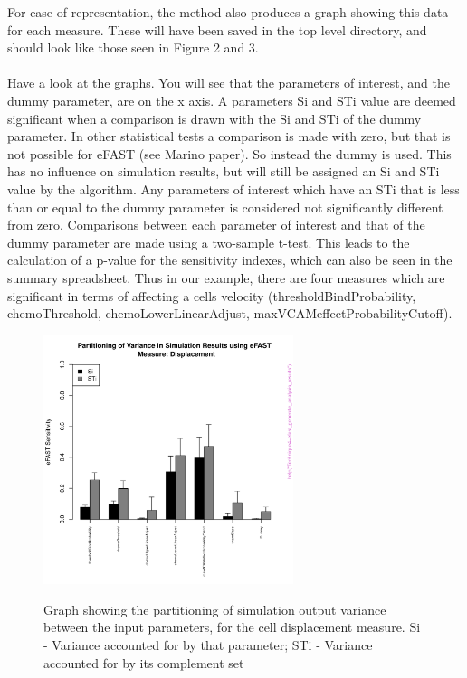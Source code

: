 \documentclass[a4paper,11pt]{article}
\begin{document}
\begin{enumerate}
For ease of representation, the method also produces a graph showing this data for each measure.  These will have been saved in the top level directory, and should look like those seen in Figure 2 and 3.\\
\\
Have a look at the graphs. You will see that the parameters of interest, and the dummy parameter, are on the x axis. A parameters Si and STi value are deemed significant when a comparison is drawn with the Si and STi of the dummy parameter. In other statistical tests a comparison is made with zero, but that is not possible for eFAST (see Marino paper). So instead the dummy is used. This has no influence on simulation results, but will still be assigned an Si and STi value by the algorithm. Any parameters of interest which have an STi that is less than or equal to the dummy parameter is considered not significantly different from zero.  Comparisons between each parameter of interest and that of the dummy parameter are made using a two-sample t-test. This leads to the calculation of a p-value for the sensitivity indexes, which can also be seen in the summary spreadsheet.  Thus in our example, there are four measures which are significant in terms of affecting a cells velocity (thresholdBindProbability, chemoThreshold, chemoLowerLinearAdjust, maxVCAMeffectProbabilityCutoff).


\end{enumerate}
\newpage 
\begin{figure}[h!]
\centering
    \includegraphics[width=0.65\textwidth]{eFAST_Displacement.pdf}\\ \noindent
    \caption{Graph showing the partitioning of simulation output variance between the input parameters, for the cell displacement measure. Si - Variance accounted for by that parameter; STi - Variance accounted for by its complement set}
    \label{eFAST_Results1}
    \end{figure}
\end{document}
